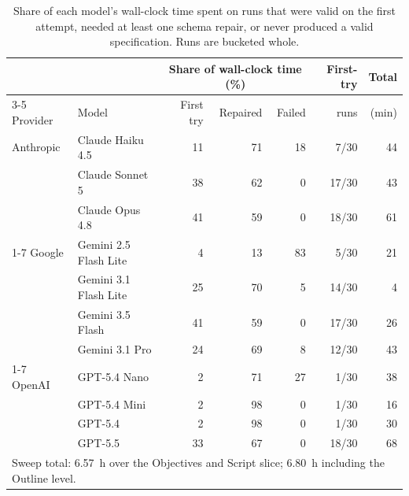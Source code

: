 \begin{table}[htbp]
  \centering
  \caption{Share of each model's wall-clock time spent on runs that were valid on the first attempt, needed at least one schema repair, or never produced a valid specification. Runs are bucketed whole.}
  \label{tab:time-decomposition}
  \small
  \begin{tabular}{llrrrrr}
    \toprule
    & & \multicolumn{3}{c}{Share of wall-clock time (\%)} & First-try & Total \\
    \cmidrule(lr){3-5}
    Provider & Model & First try & Repaired & Failed & runs & (min) \\
    \midrule
    Anthropic & Claude Haiku 4.5 & 11 & 71 & 18 & 7/30 & 44 \\
     & Claude Sonnet 5 & 38 & 62 & 0 & 17/30 & 43 \\
     & Claude Opus 4.8 & 41 & 59 & 0 & 18/30 & 61 \\
    \cmidrule(lr){1-7}
    Google & Gemini 2.5 Flash Lite & 4 & 13 & 83 & 5/30 & 21 \\
     & Gemini 3.1 Flash Lite & 25 & 70 & 5 & 14/30 & 4 \\
     & Gemini 3.5 Flash & 41 & 59 & 0 & 17/30 & 26 \\
     & Gemini 3.1 Pro & 24 & 69 & 8 & 12/30 & 43 \\
    \cmidrule(lr){1-7}
    OpenAI & GPT-5.4 Nano & 2 & 71 & 27 & 1/30 & 38 \\
     & GPT-5.4 Mini & 2 & 98 & 0 & 1/30 & 16 \\
     & GPT-5.4 & 2 & 98 & 0 & 1/30 & 30 \\
     & GPT-5.5 & 33 & 67 & 0 & 18/30 & 68 \\
    \midrule
    \multicolumn{7}{l}{\footnotesize Sweep total: 6.57~h over the Objectives and Script slice; 6.80~h including the Outline level.} \\
    \bottomrule
  \end{tabular}
\end{table}


